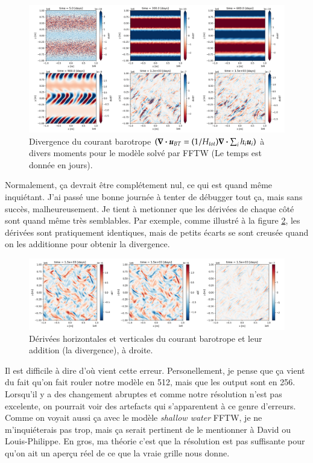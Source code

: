 \documentclass[10pt]{article}
\numberwithin{equation}{section}
\newcommand{\uu}{\vb*{u}}
\begin{document}
\begin{figure}[!htpb]
\centering
\includegraphics[width=.9\linewidth]{figures/debuggage/2023_06_21divBT1_FFT.png}
\caption{\label{fig:orgf52e662}Divergence du courant barotrope  \(\qty(\div{\uu_{BT}} = \qty(1/H_{tot}) \div{\sum_i h_i \uu_i})\) à divers moments pour le modèle solvé par FFTW (Le temps est donnée en jours).}
\end{figure}

Normalement, ça devrait être complétement nul, ce qui est quand même inquiétant.
J'ai passé une bonne journée à tenter de débugger tout ça, mais sans succès, malheureusement.
Je tient à metionner que les dérivées de chaque côté sont quand même très semblables.
Par exemple, comme illustré à la figure \ref{fig:orgf6c69fe}, les dérivées sont pratiquement identiques, mais de petits écarts se sont creusée quand on les additionne pour obtenir la divergence. 

\begin{figure}[!htpb]
\centering
\includegraphics[width=.9\linewidth]{figures/debuggage/2023_06_27_comp_divBT.png}
\caption{\label{fig:orgf6c69fe}Dérivées horizontales et verticales du courant barotrope et leur addition (la divergence), à droite.}
\end{figure}

Il est difficile à dire d'où vient cette erreur.
Personellement, je pense que ça vient du fait qu'on fait rouler notre modèle en 512, mais que les output sont en 256.
Lorsqu'il y a des changement abruptes et comme notre résolution n'est pas excelente, on pourrait voir des artefacts qui s'apparentent à ce genre d'erreurs.
Comme on voyait aussi ça avec le modèle \emph{shallow water} FFTW, je ne m'inquiéterais pas trop, mais ça serait pertinent de le mentionner à David ou Louis-Philippe.
En gros, ma théorie c'est que la résolution est pas suffisante pour qu'on ait un aperçu réel de ce que la vraie grille nous donne.
\end{document}
